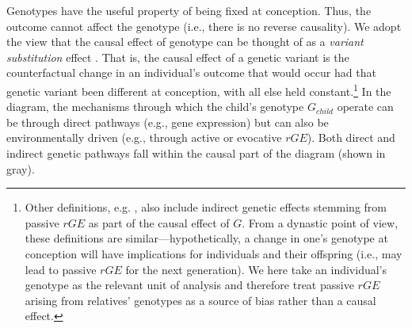 \documentclass[12pt,a4paper]{article}
\begin{document}
\begin{bibunit}
Genotypes have the useful property of being fixed at conception. Thus, the outcome cannot affect the genotype (i.e., there is no reverse causality). We adopt the view that the causal effect of genotype can be thought of as a \textit{variant substitution} effect \citep{lee2013causal,morris2020population}. That is, the causal effect of a genetic variant is the counterfactual change in an individual's outcome that would occur had that genetic variant been different at conception, with all else held constant.\footnote{Other definitions, e.g. \citet{young2022mendelian}, also include indirect genetic effects stemming from passive $rGE$ as part of the causal effect of $G$. From a dynastic point of view, these definitions are similar---hypothetically, a change in one's genotype at conception will have implications for individuals and their offspring (i.e., may lead to passive $rGE$ for the next generation). We here take an individual's genotype as the relevant unit of analysis and therefore treat passive $rGE$ arising from relatives' genotypes as a source of bias rather than a causal effect.} 
In the diagram, the mechanisms through which the child's genotype $G_{child}$ operate can be through direct pathways (e.g., gene expression) but can also be environmentally driven (e.g., through active or evocative $rGE$). Both direct and indirect genetic pathways fall within the causal part of the diagram (shown in gray). 


\end{bibunit}
\end{document}
